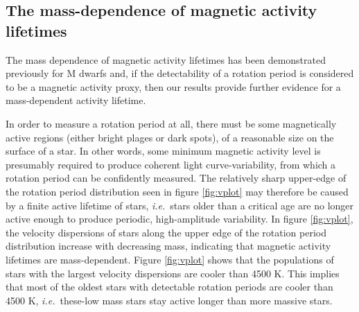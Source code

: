\documentclass{aastex63}
\newcommand{\ie}{{\it i.e.}}
\newcommand{\eg}{{\it e.g.}}
\newcommand{\kepler}{{\it Kepler}}
\newcommand{\racomment}[1]{{\color{black}#1}}
\begin{document}
\racomment{

\subsection{The mass-dependence of magnetic activity lifetimes}
\label{sec:activity}

The mass dependence of magnetic activity lifetimes has been demonstrated
previously \racomment{for M dwarfs} \citep[\eg][]{west2008, reiners2008,
west2009, newton2017, kiman2019} and, if the detectability of a rotation
period is considered to be a magnetic activity proxy, then our results provide
further evidence for a mass-dependent activity lifetime.

In order to measure a rotation period at all, there must be some magnetically
active regions (either bright plages or dark spots), of a reasonable size on
the surface of a star.
In other words, some minimum magnetic activity level is presumably required to
produce coherent light curve-variability, from which a rotation period can be
confidently measured.
The relatively sharp upper-edge of the rotation period distribution seen in
figure \ref{fig:vplot} may therefore be caused by a finite active lifetime of
stars, \ie\ stars older than a critical age are no longer active enough to
produce periodic, high-amplitude variability.
In figure \ref{fig:vplot}, the velocity dispersions of stars along the upper
edge of the rotation period distribution increase with decreasing mass,
indicating that magnetic activity lifetimes are mass-dependent.
Figure \ref{fig:vplot} shows that the populations of stars with the largest
velocity dispersions are cooler than 4500 K.
This implies that most of the oldest stars with detectable rotation periods
are cooler than 4500 K, \ie\ these-low mass stars stay active longer than more
massive stars.
}
\end{document}
